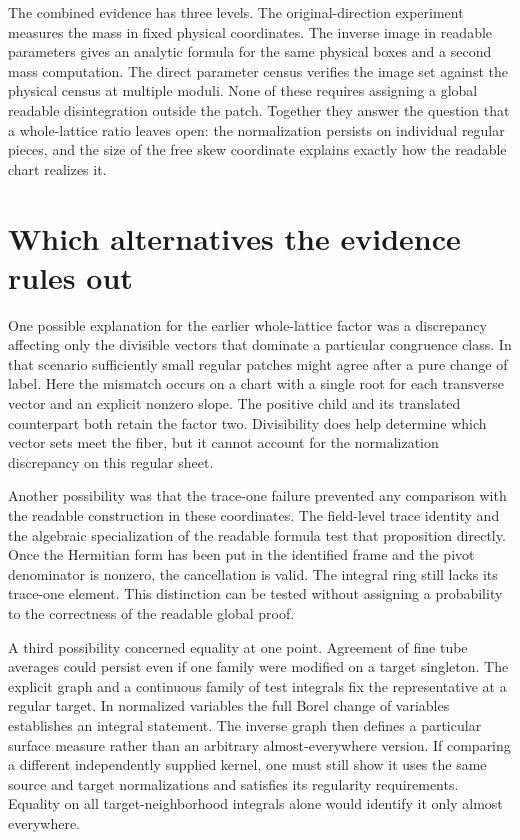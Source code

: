 \documentclass[12pt,letterpaper]{article}
\begin{document}
The combined evidence has three levels. The original-direction experiment measures the mass in fixed physical coordinates. The inverse image in readable parameters gives an analytic formula for the same physical boxes and a second mass computation. The direct parameter census verifies the image set against the physical census at multiple moduli. None of these requires assigning a global readable disintegration outside the patch. Together they answer the question that a whole-lattice ratio leaves open: the normalization persists on individual regular pieces, and the size of the free skew coordinate explains exactly how the readable chart realizes it.

\section{Which alternatives the evidence rules out}
One possible explanation for the earlier whole-lattice factor was a discrepancy affecting only the divisible vectors that dominate a particular congruence class. In that scenario sufficiently small regular patches might agree after a pure change of label. Here the mismatch occurs on a chart with a single root for each transverse vector and an explicit nonzero slope. The positive child and its translated counterpart both retain the factor two. Divisibility does help determine which vector sets meet the fiber, but it cannot account for the normalization discrepancy on this regular sheet.

Another possibility was that the trace-one failure prevented any comparison with the readable construction in these coordinates. The field-level trace identity and the algebraic specialization of the readable formula test that proposition directly. Once the Hermitian form has been put in the identified frame and the pivot denominator is nonzero, the cancellation is valid. The integral ring still lacks its trace-one element. This distinction can be tested without assigning a probability to the correctness of the readable global proof.

A third possibility concerned equality at one point. Agreement of fine tube averages could persist even if one family were modified on a target singleton. The explicit graph and a continuous family of test integrals fix the representative at a regular target. In normalized variables the full Borel change of variables establishes an integral statement. The inverse graph then defines a particular surface measure rather than an arbitrary almost-everywhere version. If comparing a different independently supplied kernel, one must still show it uses the same source and target normalizations and satisfies its regularity requirements. Equality on all target-neighborhood integrals alone would identify it only almost everywhere.
\end{document}
